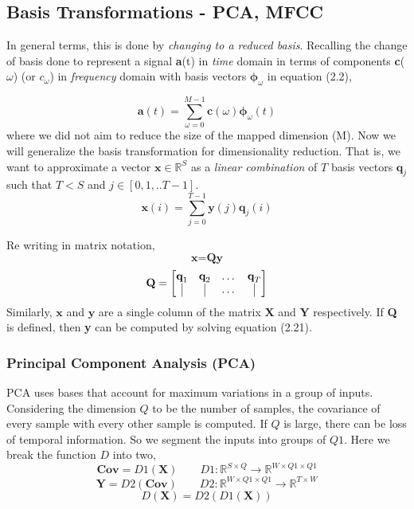 \subsection{Basis Transformations - PCA, MFCC}
In general terms, this is done by \textit{changing to a reduced basis}. Recalling the change of basis done to represent a signal \textbf{a}(t) in \textit{time} domain in terms of components \textbf{c}($\omega$) (or $c_{ \omega }$)  in \textit{frequency} domain with basis vectors $\bm{\phi}_{ \omega }$ in equation (2.2),
  
\[
\textbf{a}(t) = \displaystyle\sum_{ \omega =0}^{M-1}\textbf{c}( \omega )\bm{\phi}_{ \omega }(t)
\]
where we did not aim to reduce the size of the mapped dimension (M). Now we will generalize the basis transformation for dimensionality reduction. That is, we want to approximate a vector $\textbf{x} \in \mathbb{R}^{S}$ as a \textit{linear combination} of $T$ basis vectors $\textbf{q}_{j}$ such that $T < S$ and $j \in [0,1,..T-1]$.     
\begin{equation}
\textbf{x}(i) = \displaystyle\sum_{j =0}^{T-1}\textbf{y}(j)\textbf{q}_{j}(i)
\end{equation}

Re writing in matrix notation,
\begin{equation}
\textbf{x} = \textbf{Q}\textbf{y} 
\end{equation}
\[
\textbf{Q} = 
\begin{bmatrix}
    \textbf{q}_{1} & \textbf{q}_{2} & \dots  & \textbf{q}_{T} \\
    \vline & \vline & \dots & \vline \\
\end{bmatrix}
\]
Similarly, $\textbf{x}$ and $\textbf{y}$ are a single column of the matrix $\textbf{X}$ and $\textbf{Y}$ respectively. If \textbf{Q} is defined, then \textbf{y} can be computed by solving equation (2.21). 

\subsubsection{Principal Component Analysis (PCA)}
PCA uses bases that account for maximum variations in a group of inputs. Considering the dimension $Q$ to be the number of samples, the covariance of every sample with every other sample is computed. If $Q$ is large, there can be loss of temporal information. So we segment the inputs into groups of $Q1$.  Here we break the function $D$ into two,
\[
  \textbf{Cov} = D1(\textbf{X}) \qquad D1 : \mathbb{R}^{S \times Q} \rightarrow \mathbb{R}^{W \times Q1 \times Q1}
\]
\[
  \textbf{Y} = D2(\textbf{Cov}) \qquad D2 : \mathbb{R}^{W \times Q1 \times Q1} \rightarrow \mathbb{R}^{T \times W}
\]
\[
D(\textbf{X}) = D2(D1(\textbf{X}))
\]

